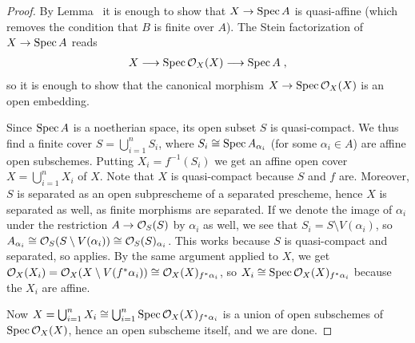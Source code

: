 \documentclass[a4paper,parskip=half,numbers=enddot, DIV=12]{scrreprt}
\renewcommand{\leq}{\leqslant}
\begin{document}
\begin{proof}
	By Lemma~ it is enough to show that $X\morphism\Spec A$ is quasi-affine (which removes the condition that $B$ is finite over $A$). The Stein factorization of $X\morphism\Spec A$ reads
	\begin{align*}
		X\morphism\Spec \Oo_X(X)\morphism\Spec A\;,
	\end{align*}
	so it is enough to show that the canonical morphism $X\morphism\Spec\Oo_X(X)$ is an open embedding.
	
	Since $\operatorname{Spec} A$ is a noetherian space, its open subset $S$ is quasi-compact. We thus find a finite cover $S=\bigcup_{i=1}^n S_i$, where $S_i\cong \operatorname{Spec} A_{\alpha_i}$ (for some $\alpha_i\in A$) are affine open subschemes. Putting $X_i=f^{-1}(S_i)$ we get an affine open cover $X=\bigcup_{i=1}^nX_i$ of $X$. %
	Note that $X$ is quasi-compact because $S$ and $f$ are. Moreover, $S$ is separated as an open subprescheme of a separated prescheme, hence $X$ is separated as well, as finite morphisms are separated. If we denote the image of $\alpha_i$ under the restriction $A\morphism \Oo_S(S)$ by $\alpha_i$ as well, we see that $S_i=S\setminus V(\alpha_i)$, so $A_{\alpha_i}\cong \mathcal{O}_S(S\setminus V(\alpha_i))\cong \mathcal{O}_S(S)_{\alpha_i}$. This works because $S$ is quasi-compact and separated, so \cite[Proposition~1.5.1]{alggeo1} applies. By the same argument applied to $X$, we get $\mathcal{O}_X(X_i)=\mathcal{O}_X(X\setminus V(f^*\alpha_i))\cong \mathcal{O}_X(X)_{f^*\alpha_i}$, so $X_i\cong \operatorname{Spec} \mathcal{O}_X(X)_{f^*\alpha_i}$ because the $X_i$ are affine.
	
	Now $X=\bigcup_{i=1}^nX_i\cong \bigcup_{i=1}^n\operatorname{Spec} \mathcal{O}_X(X)_{f^*\alpha_i}$ is a union of open subschemes of $\operatorname{Spec} \mathcal{O}_X(X)$, hence an open subscheme itself, and we are done.
\end{proof}
\end{document}

